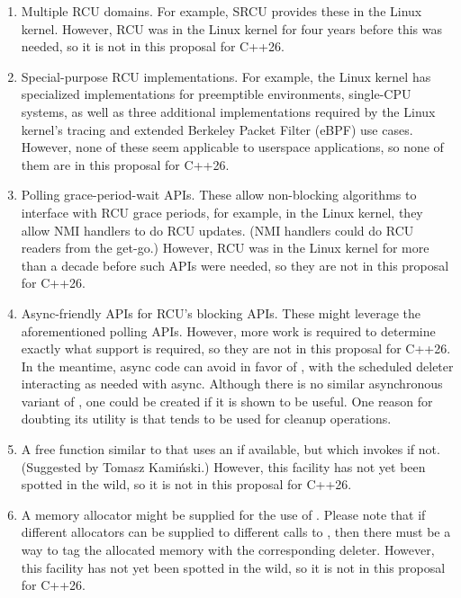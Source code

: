 \begin{enumerate}
\item	Multiple RCU domains.
	For example, SRCU provides these in the Linux kernel.
	However, RCU was in the Linux kernel for four years before
	this was needed, so it is not in this proposal for C++26.
\item	Special-purpose RCU implementations.
	For example, the Linux kernel has specialized implementations
	for preemptible environments, single-CPU systems,
	as well as three additional implementations required by
	the Linux kernel's tracing and extended Berkeley Packet
	Filter (eBPF) use cases.
	However, none of these seem applicable to userspace applications,
	so none of them are in this proposal for C++26.
\item	Polling grace-period-wait APIs.
	These allow non-blocking algorithms to interface with RCU
	grace periods, for example, in the Linux kernel, they allow
	NMI handlers to do RCU updates.
	(NMI handlers could do RCU readers from the get-go.)
	However, RCU was in the Linux kernel for more than a decade before
	such APIs were needed, so they are not in this proposal for C++26.
\item	Async-friendly APIs for RCU's blocking APIs.
	These might leverage the aforementioned polling APIs.
	However, more work is required to determine exactly what support
	is required, so they are not in this proposal for C++26.
	In the meantime, async code can avoid 
	in favor of , with the scheduled deleter
	interacting as needed with async.
	Although there is no similar asynchronous variant of
	, one could be created if it is shown
	to be useful.
	One reason for doubting its utility is that 
	tends to be used for cleanup operations.
\item	A free function similar to  that uses
	an  if available, but which invokes
	 if not.
	(Suggested by Tomasz Kami\'{n}ski.)
	However, this facility has not yet been spotted in the wild,
	so it is not in this proposal for C++26.
\item	A memory allocator might be supplied for the use of
	.
	Please note that if different allocators can be supplied to
	different calls to , then there must be a way
	to tag the allocated memory with the corresponding deleter.
	However, this facility has not yet been spotted in the wild,
	so it is not in this proposal for C++26.


\end{enumerate}
